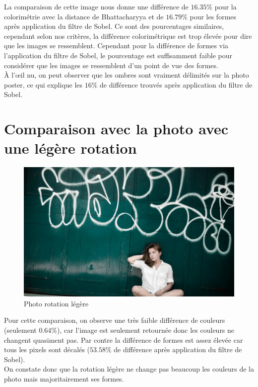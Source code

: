 \documentclass[]{article}
\begin{document}
La comparaison de cette image nous donne une différence de $16.35\%$
pour la colorimétrie avec la distance de Bhattacharyya et de $16.79\%$
pour les formes après application du filtre de Sobel. Ce sont des
pourcentages similaires, cependant selon nos critères, la différence
colorimétrique est trop élevée pour dire que les images se ressemblent.
Cependant pour la différence de formes via l'application du filtre de
Sobel, le pourcentage est suffisamment faible pour considérer que les
images se ressemblent d'un point de vue des formes. \\
À l'\oe il nu, on peut observer que les ombres sont vraiment délimités sur la
photo poster, ce qui explique les $16\%$ de différence trouvés après
application du filtre de Sobel.

\newpage

\section{Comparaison avec la photo avec une légère
rotation}\label{comparaison-avec-la-photo-avec-une-luxe9guxe8re-rotation}

\begin{figure}[htbp]
\centering
\includegraphics{photos/rotate.jpg}
\caption{Photo rotation légère}
\end{figure}

Pour cette comparaison, on observe une très faible différence de
couleurs (seulement $0.64\%$), car l'image est seulement retournée donc
les couleurs ne changent quasiment pas. Par contre la différence de
formes est assez élevée car tous les pixels sont décalés ($53.58\%$ de
différence après application du filtre de Sobel).\\On constate donc que
la rotation légère ne change pas beaucoup les couleurs de la photo mais
majoritairement ses formes.
\end{document}
